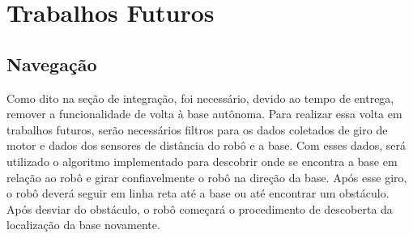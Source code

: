 \section{Trabalhos Futuros}

\subsection{Navegação}

Como dito na seção de integração, foi necessário, devido ao tempo de entrega, remover a funcionalidade de volta à base autônoma. Para realizar essa volta em trabalhos futuros, serão necessários filtros para os dados coletados de giro de motor e dados dos sensores de distância do robô e a base. Com esses dados, será utilizado o algoritmo implementado para descobrir onde se encontra a base em relação ao robô e girar confiavelmente o robô na direção da base. Após esse giro, o robô deverá seguir em linha reta até a base ou até encontrar um obstáculo. Após desviar do obstáculo, o robô começará o procedimento de descoberta da localização da base novamente.